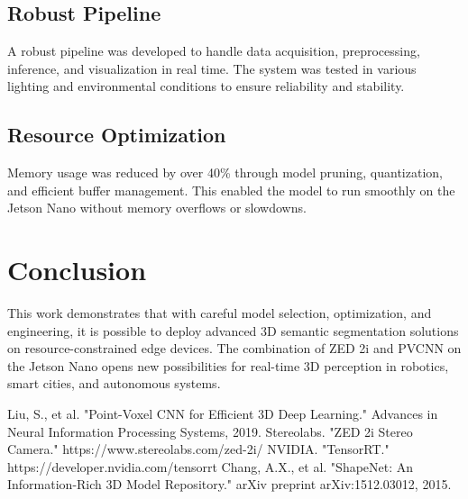 \documentclass[12pt,a4paper]{report}
\begin{document}
\section{Robust Pipeline}
A robust pipeline was developed to handle data acquisition, preprocessing, inference, and visualization in real time. The system was tested in various lighting and environmental conditions to ensure reliability and stability.

\section{Resource Optimization}
Memory usage was reduced by over 40\% through model pruning, quantization, and efficient buffer management. This enabled the model to run smoothly on the Jetson Nano without memory overflows or slowdowns.

\chapter{Conclusion}
This work demonstrates that with careful model selection, optimization, and engineering, it is possible to deploy advanced 3D semantic segmentation solutions on resource-constrained edge devices. The combination of ZED 2i and PVCNN on the Jetson Nano opens new possibilities for real-time 3D perception in robotics, smart cities, and autonomous systems.

\newpage
{}
\begin{thebibliography}{9}
 Liu, S., et al. "Point-Voxel CNN for Efficient 3D Deep Learning." Advances in Neural Information Processing Systems, 2019.
 Stereolabs. "ZED 2i Stereo Camera." https://www.stereolabs.com/zed-2i/
 NVIDIA. "TensorRT." https://developer.nvidia.com/tensorrt
 Chang, A.X., et al. "ShapeNet: An Information-Rich 3D Model Repository." arXiv preprint arXiv:1512.03012, 2015.
\end{thebibliography}
\end{document}
